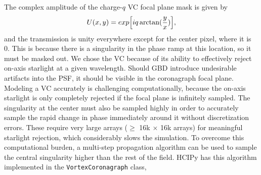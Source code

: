 The complex amplitude of the charge-$q$ VC focal plane mask is given by
\begin{equation}
	U(x,y) = exp\Bigl[i q \arctan(\frac{y}{x})\Bigr],
	\label{eq:vortex}
\end{equation}
and the transmission is unity everywhere except for the center pixel, where it is 0. This is because there is a singularity in the phase ramp at this location, so it must be masked out. We chose the VC because of its ability to effectively reject on-axis starlight at a given wavelength. Should GBD introduce undesirable artifacts into the PSF, it should be visible in the coronagraph focal plane. Modeling a VC accurately is challenging computationally, because the on-axis starlight is only completely rejected if the focal plane is infinitely sampled. The singularity at the center must also be sampled highly in order to accurately sample the rapid change in phase immediately around it without discretization errors. These require very large arrays ($\ge$ 16k $\times$ 16k arrays) for meaningful starlight rejection, which considerably slows the simulation. To overcome this computational burden, a multi-step propagation algorithm can be used to sample the central singularity higher than the rest of the field. HCIPy\cite{por2018hcipy} has this algorithm implemented in the \verb"VortexCoronagraph" class, 

\label{sect:results}  %

